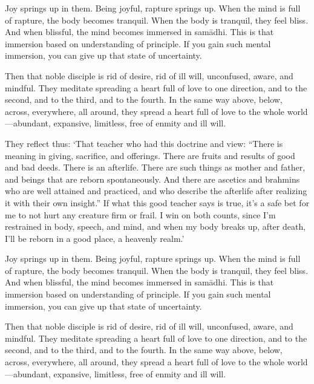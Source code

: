 \documentclass[12pt,openany]{book}%
\begin{document}
Joy springs up in them. Being joyful, rapture springs up. When the mind is full of rapture, the body becomes tranquil. When the body is tranquil, they feel bliss. And when blissful, the mind becomes immersed in \textsanskrit{samādhi}. This is that immersion based on understanding of principle. If you gain such mental immersion, you can give up that state of uncertainty. 

Then that noble disciple is rid of desire, rid of ill will, unconfused, aware, and mindful. They meditate spreading a heart full of love to one direction, and to the second, and to the third, and to the fourth. In the same way above, below, across, everywhere, all around, they spread a heart full of love to the whole world—abundant, expansive, limitless, free of enmity and ill will. 

They reflect thus: ‘That teacher who had this doctrine and view: “There is meaning in giving, sacrifice, and offerings. There are fruits and results of good and bad deeds. There is an afterlife. There are such things as mother and father, and beings that are reborn spontaneously. And there are ascetics and brahmins who are well attained and practiced, and who describe the afterlife after realizing it with their own insight.” If what this good teacher says is true, it’s a safe bet for me to not hurt any creature firm or frail. I win on both counts, since I’m restrained in body, speech, and mind, and when my body breaks up, after death, I’ll be reborn in a good place, a heavenly realm.’ 

Joy springs up in them. Being joyful, rapture springs up. When the mind is full of rapture, the body becomes tranquil. When the body is tranquil, they feel bliss. And when blissful, the mind becomes immersed in \textsanskrit{samādhi}. This is that immersion based on understanding of principle. If you gain such mental immersion, you can give up that state of uncertainty. 

Then that noble disciple is rid of desire, rid of ill will, unconfused, aware, and mindful. They meditate spreading a heart full of love to one direction, and to the second, and to the third, and to the fourth. In the same way above, below, across, everywhere, all around, they spread a heart full of love to the whole world—abundant, expansive, limitless, free of enmity and ill will. 
\end{document}
